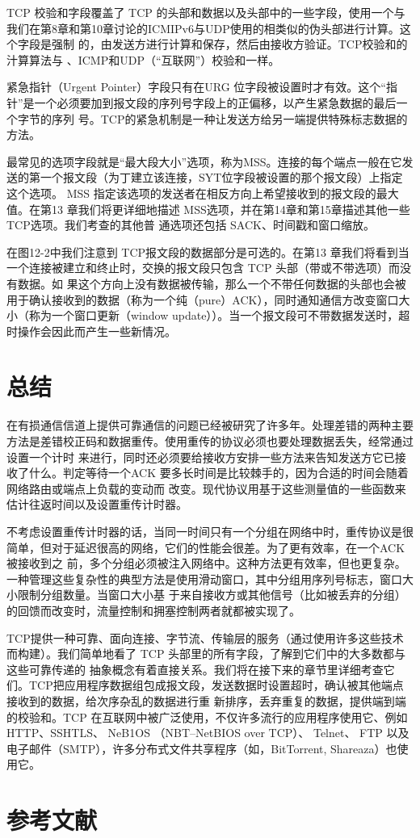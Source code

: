 TCP 校验和字段覆盖了 TCP 的头部和数据以及头部中的一些字段，使用一个与我们在第8章和第10章讨论的ICMIPv6与UDP使用的相类似的伪头部进行计算。这个字段是强制
的，由发送方进行计算和保存，然后由接收方验证。TCP校验和的汁算算法与 、ICMP和UDP（“互联网”）校验和一样。

紧急指针（Urgent Pointer）字段只有在URG 位字段被设置时才有效。这个“指针”是一个必须要加到报文段的序列号字段上的正偏移，以产生紧急数据的最后一个字节的序列
号。TCP的紧急机制是一种让发送方给另一端提供特殊标志数据的方法。

最常见的选项字段就是“最大段大小”选项，称为MSS。连接的每个端点一般在它发送的第一个报文段（为丁建立该连接，SYT位字段被设置的那个报文段）上指定这个选项。
MSS 指定该选项的发送者在相反方向上希望接收到的报文段的最大值。在第13 章我们将更详细地描述 MSS选项，并在第14章和第15章描述其他一些TCP选项。我们考查的其他普
通选项还包括 SACK、时间戳和窗口缩放。

在图12-2中我们注意到 TCP报文段的数据部分是可选的。在第13 章我们将看到当一个连接被建立和终止时，交换的报文段只包含 TCP 头部（带或不带选项）而没有数据。如
果这个方向上没有数据被传输，那么一个不带任何数据的头部也会被用于确认接收到的数据（称为一个纯（pure）ACK），同时通知通信方改变窗口大小（称为一个窗口更新（window
update））。当一个报文段可不带数据发送时，超时操作会因此而产生一些新情况。
\section{总结}
在有损通信信道上提供可靠通信的问题已经被研究了许多年。处理差错的两种主要方法是差错校正码和数据重传。使用重传的协议必须也要处理数据丢失，经常通过设置一个计时
来进行，同时还必须要给接收方安排一些方法来告知发送方它已接收了什么。判定等待一个ACK 要多长时间是比较棘手的，因为合适的时间会随着网络路由或端点上负载的变动而
改变。现代协议用基于这些测量值的一些函数来估计往返时间以及设置重传计时器。

不考虑设置重传计时器的话，当同一时间只有一个分组在网络中时，重传协议是很简单，但对于延迟很高的网络，它们的性能会很差。为了更有效率，在一个ACK 被接收到之
前，多个分组必须被注入网络中。这种方法更有效率，但也更复杂。一种管理这些复杂性的典型方法是使用滑动窗口，其中分组用序列号标志，窗口大小限制分组数量。当窗口大小基
于来自接收方或其他信号（比如被丢弃的分组）的回馈而改变时，流量控制和拥塞控制两者就都被实现了。

TCP提供一种可靠、面向连接、字节流、传输层的服务（通过使用许多这些技术而构建）。我们简单地看了 TCP 头部里的所有字段，了解到它们中的大多数都与这些可靠传递的
抽象概念有着直接关系。我们将在接下来的章节里详细考查它们。TCP把应用程序数据组包成报文段，发送数据时设置超时，确认被其他端点接收到的数据，给次序杂乱的数据进行重
新排序，丢弃重复的数据，提供端到端的校验和。TCP 在互联网中被广泛使用，不仅许多流行的应用程序使用它、例如 HTTP、SSHTLS、 NeB1OS （NBT--NetBIOS over TCP）、
Telnet、 FTP 以及电子邮件（SMTP），许多分布式文件共享程序（如，BitTorrent, Shareaza）也使用它。
\section{参考文献}
